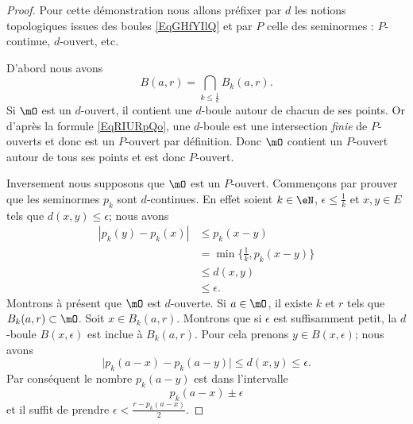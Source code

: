 \begin{proof}
	Pour cette démonstration nous allons préfixer par \( d\) les notions topologiques issues des boules \eqref{EqGHfYIlQ} et par \( P\) celle des seminormes : \( P\)-continue, \( d\)-ouvert, etc.

	D'abord nous avons
	\begin{equation}    \label{EqRIURpQo}
		B(a,r)=\bigcap_{k\leq \frac{1}{ k }}B_k(a,r).
	\end{equation}
	Si \( \mO\) est un \( d\)-ouvert, il contient une \( d\)-boule autour de chacun de ses points. Or d'après la formule \eqref{EqRIURpQo}, une \( d\)-boule est une intersection \emph{finie} de \( P\)-ouverts et donc est un \( P\)-ouvert par définition. Donc \( \mO\) contient un \( P\)-ouvert autour de tous ses points et est donc \( P\)-ouvert.

	Inversement nous supposons que \( \mO\) est un \( P\)-ouvert. Commençons par prouver que les seminormes \( p_k\) sont \( d\)-continues. En effet soient \( k\in \eN\), \( \epsilon\leq \frac{1}{ k }\) et \( x,y\in E\) tels que \( d(x,y)\leq \epsilon\); nous avons
	\begin{subequations}
		\begin{align}
			| p_k(y)-p_k(x) | & \leq p_k(x-y)                     \\
			                  & =\min\{ \frac{1}{ k },p_k(x-y) \} \\
			                  & \leq d(x,y)                       \\
			                  & \leq \epsilon.
		\end{align}
	\end{subequations}
	Montrons à présent que \( \mO\) est \( d\)-ouverte. Si \( a\in\mO\), il existe \( k\) et \( r\) tels que \( B_k(a,r)\subset\mO\). Soit \( x\in B_k(a,r)\). Montrons que si \( \epsilon\) est suffisamment petit, la \( d\)-boule \( B(x,\epsilon)\) est inclue à \( B_k(a,r)\). Pour cela prenons \( y\in B(x,\epsilon)\); nous avons
	\begin{equation}
		\big| p_k(a-x)-p_k(a-y) \big|\leq d(x,y)\leq \epsilon.
	\end{equation}
	Par conséquent le nombre \( p_k(a-y)\) est dans l'intervalle
	\begin{equation}
		p_k(a-x)\pm\epsilon
	\end{equation}
	et il suffit de prendre \( \epsilon<\frac{ r-p_k(a-x) }{2}\).
\end{proof}

